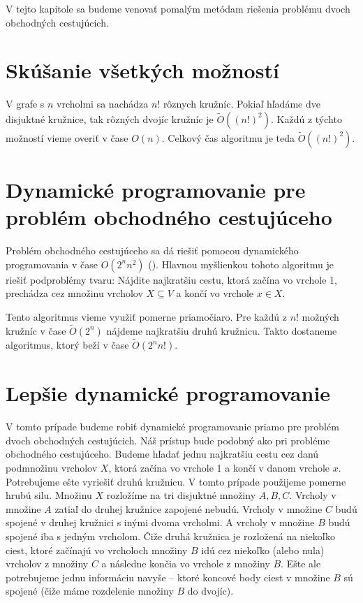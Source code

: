 V tejto kapitole sa budeme venovať pomalým metódam riešenia problému
dvoch obchodných cestujúcich.

\section{Skúšanie všetkých možností}

V grafe s $n$ vrcholmi sa nachádza $n!$ rôznych kružníc. Pokiaľ hľadáme
dve disjuktné kružnice, tak rôzných dvojíc kružníc je $\tilde{O}((n!)^2)$.
Každú z týchto možností vieme overiť v čase $O(n)$. Celkový čas algoritmu
je teda $\tilde{O}((n!)^2)$.

\section{Dynamické programovanie pre problém obchodného cestujúceho}

Problém obchodného cestujúceho sa dá riešiť pomocou dynamického
programovania v čase $O(2^n n^2)$ (\cite{Held}). Hlavnou myšlienkou
tohoto algoritmu je riešiť podproblémy tvaru: Nájdite najkratšiu cestu, ktorá
začína vo vrchole 1, prechádza cez množinu vrcholov $X \subseteq V$ a končí vo vrchole
$x \in X$.

Tento algoritmus vieme využiť pomerne priamočiaro. Pre každú z $n!$ možných kružníc
v čase $\tilde{O}(2^n)$ nájdeme najkratšiu druhú kružnicu. Takto dostaneme
algoritmus, ktorý beží v čase $\tilde{O}(2^n n!)$. 

\section{Lepšie dynamické programovanie}

V tomto prípade budeme robiť dynamické programovanie priamo pre problém
dvoch obchodných cestujúcich. Náš prístup bude podobný ako pri probléme
obchodného cestujúceho. 
Budeme hľadať jednu najkratšiu cestu cez danú podmnožinu vrcholov
$X$, ktorá začína vo vrchole 1 a končí v danom vrchole $x$. Potrebujeme ešte vyriešiť
druhú kružnicu. V tomto prípade použijeme pomerne hrubú silu.
Množinu $X$ rozložíme na tri disjuktné množiny $A, B, C$.
Vrcholy v množine $A$ zatiaľ do druhej kružnice zapojené nebudú. Vrcholy v množine
$C$ budú spojené v druhej kružnici s inými dvoma vrcholmi.
A vrcholy v množine $B$ budú spojené iba s jedným vrcholom. Čiže druhá kružnica je
rozložená na niekoľko ciest, ktoré začínajú vo vrcholoch množiny $B$ idú cez niekoľko
(alebo nula) vrcholov z množiny $C$ a následne končia vo vrchole z množiny $B$.
Ešte ale potrebujeme jednu informáciu navyše -- ktoré koncové body ciest v množine
$B$ sú spojené (čiže máme rozdelenie množiny $B$ do dvojíc).

